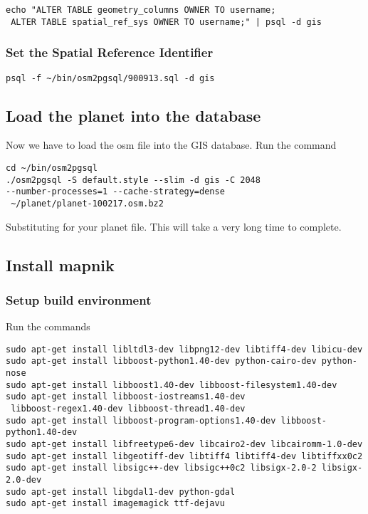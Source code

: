 \begin{verbatim}
echo "ALTER TABLE geometry_columns OWNER TO username;
 ALTER TABLE spatial_ref_sys OWNER TO username;" | psql -d gis
\end{verbatim}

\subsubsection{Set the Spatial Reference Identifier}

\begin{verbatim}
psql -f ~/bin/osm2pgsql/900913.sql -d gis
\end{verbatim}

\subsection{Load the planet into the database}

Now we have to load the osm file into the GIS database. Run the command 

\begin{verbatim}
cd ~/bin/osm2pgsql
./osm2pgsql -S default.style --slim -d gis -C 2048 
--number-processes=1 --cache-strategy=dense
 ~/planet/planet-100217.osm.bz2
\end{verbatim}

Substituting for your planet file. This will take a very long time to complete.

\subsection{Install mapnik}

\subsubsection{Setup build environment}

Run the commands
\begin{verbatim}
sudo apt-get install libltdl3-dev libpng12-dev libtiff4-dev libicu-dev
sudo apt-get install libboost-python1.40-dev python-cairo-dev python-nose
sudo apt-get install libboost1.40-dev libboost-filesystem1.40-dev
sudo apt-get install libboost-iostreams1.40-dev
 libboost-regex1.40-dev libboost-thread1.40-dev
sudo apt-get install libboost-program-options1.40-dev libboost-python1.40-dev
sudo apt-get install libfreetype6-dev libcairo2-dev libcairomm-1.0-dev
sudo apt-get install libgeotiff-dev libtiff4 libtiff4-dev libtiffxx0c2
sudo apt-get install libsigc++-dev libsigc++0c2 libsigx-2.0-2 libsigx-2.0-dev
sudo apt-get install libgdal1-dev python-gdal
sudo apt-get install imagemagick ttf-dejavu
\end{verbatim}

